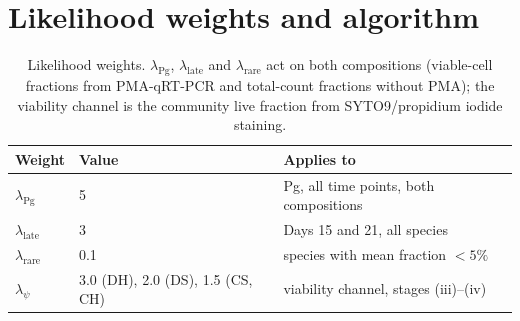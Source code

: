\documentclass[11pt,a4paper]{article}
\begin{document}
\section{Likelihood weights and algorithm}
\label{sec:S_alg}
\begin{table}[htbp]\centering\small
\begin{tabular}{@{}lll@{}}\toprule
Weight & Value & Applies to\\\midrule
$\lambda_{\mathrm{Pg}}$ & 5 & Pg, all time points, both compositions\\
$\lambda_{\mathrm{late}}$ & 3 & Days 15 and 21, all species\\
$\lambda_{\mathrm{rare}}$ & 0.1 & species with mean fraction $<5\%$\\
$\lambda_{\psi}$ & 3.0 (DH), 2.0 (DS), 1.5 (CS, CH) & viability channel, stages (iii)--(iv)\\\bottomrule
\end{tabular}
\caption{Likelihood weights. $\lambda_{\mathrm{Pg}}$, $\lambda_{\mathrm{late}}$ and $\lambda_{\mathrm{rare}}$ act on both compositions (viable-cell fractions from PMA-qRT-PCR and total-count fractions without PMA); the viability channel is the community live fraction from SYTO9/propidium iodide staining.}
\label{tab:weights}
\end{table}
\end{document}
